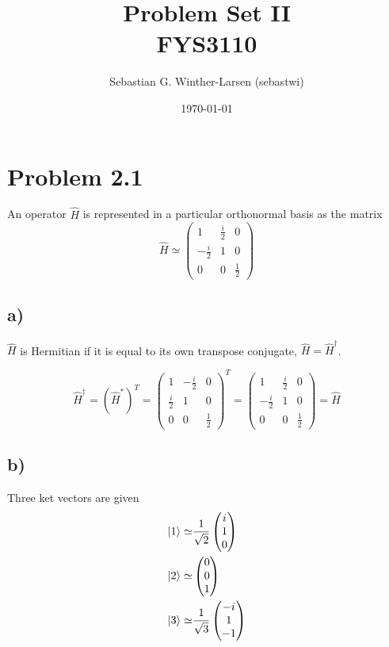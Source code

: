 \documentclass{article}
\title{Problem Set II \\
  \large{FYS3110}}
\author{Sebastian G. Winther-Larsen (sebastwi)}
\date{\today}
\newcommand*\colvec[3][]{
    \begin{pmatrix}\ifx\relax#1\relax\else#1\\\fi#2\\#3\end{pmatrix}
}
\begin{document}
\maketitle

\section*{Problem 2.1}

An operator $\hat{H}$ is represented in a particular orthonormal basis
as the matrix
\begin{equation}
\hat{H}\simeq
\begin{pmatrix}
1 & \frac{i}{2} & 0 \\
-\frac{i}{2} & 1 & 0 \\
0 & 0 & \frac{1}{2}
\end{pmatrix}
\end{equation}

\subsection*{a)}

$\hat{H}$ is Hermitian if it is equal to its own transpose conjugate,
$\hat{H}=\hat{H}^{\dagger}$.

\begin{equation}
\hat{H}^{\dagger}=(\hat{H}^*)^T=
\begin{pmatrix}
1 & -\frac{i}{2} & 0 \\
\frac{i}{2} & 1 & 0 \\
0 & 0 & \frac{1}{2}
\end{pmatrix}^T=
\begin{pmatrix}
1 & \frac{i}{2} & 0 \\
-\frac{i}{2} & 1 & 0 \\
0 & 0 & \frac{1}{2}
\end{pmatrix}=
\hat{H}
\end{equation}

\subsection*{b)}

Three ket vectors are given 
\begin{align}
\ket{1} \simeq& \frac{1}{\sqrt{2}}\colvec[i]{1}{0}  \label{ket1}\\
\ket{2} \simeq& \colvec[0]{0}{1} \label{ket2}\\
\ket{3} \simeq& \frac{1}{\sqrt{3}}\colvec[-i]{1}{-1} \label{ket3}
\end{align}
\end{document}
